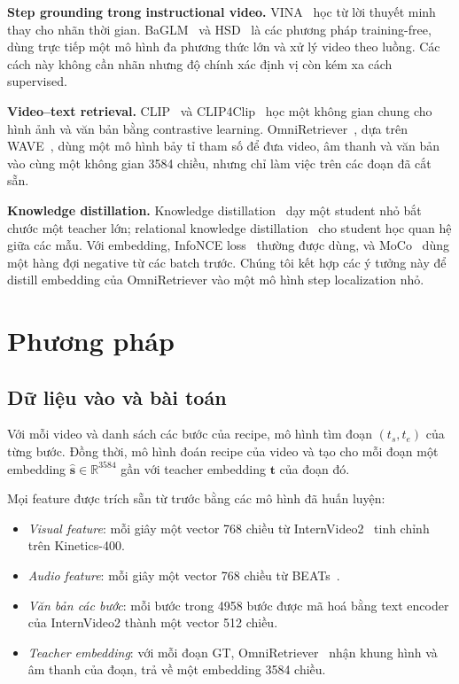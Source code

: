 \documentclass{IEEEtran}
\begin{document}
\textbf{Step grounding trong instructional video.} VINA~\cite{vina} học từ lời thuyết minh thay cho nhãn thời gian. BaGLM~\cite{baglm} và HSD~\cite{hsd} là các phương pháp training-free, dùng trực tiếp một mô hình đa phương thức lớn và xử lý video theo luồng. Các cách này không cần nhãn nhưng độ chính xác định vị còn kém xa cách supervised.

\textbf{Video--text retrieval.} CLIP~\cite{clip} và CLIP4Clip~\cite{clip4clip} học một không gian chung cho hình ảnh và văn bản bằng contrastive learning. OmniRetriever~\cite{omniretriever}, dựa trên WAVE~\cite{wave}, dùng một mô hình bảy tỉ tham số để đưa video, âm thanh và văn bản vào cùng một không gian 3584 chiều, nhưng chỉ làm việc trên các đoạn đã cắt sẵn.

\textbf{Knowledge distillation.} Knowledge distillation~\cite{kd} dạy một student nhỏ bắt chước một teacher lớn; relational knowledge distillation~\cite{rkd} cho student học quan hệ giữa các mẫu. Với embedding, InfoNCE loss~\cite{infonce} thường được dùng, và MoCo~\cite{moco} dùng một hàng đợi negative từ các batch trước. Chúng tôi kết hợp các ý tưởng này để distill embedding của OmniRetriever vào một mô hình step localization nhỏ.

\section{Phương pháp}

\subsection{Dữ liệu vào và bài toán}
Với mỗi video và danh sách các bước của recipe, mô hình tìm đoạn $(t_s, t_e)$ của từng bước. Đồng thời, mô hình đoán recipe của video và tạo cho mỗi đoạn một embedding $\hat{\mathbf{s}} \in \mathbb{R}^{3584}$ gần với teacher embedding $\mathbf{t}$ của đoạn đó.

Mọi feature được trích sẵn từ trước bằng các mô hình đã huấn luyện:
\begin{itemize}
\item \emph{Visual feature}: mỗi giây một vector 768 chiều từ InternVideo2~\cite{internvideo2} tinh chỉnh trên Kinetics-400.
\item \emph{Audio feature}: mỗi giây một vector 768 chiều từ BEATs~\cite{beats}.
\item \emph{Văn bản các bước}: mỗi bước trong 4958 bước được mã hoá bằng text encoder của InternVideo2 thành một vector 512 chiều.
\item \emph{Teacher embedding}: với mỗi đoạn GT, OmniRetriever~\cite{omniretriever} nhận khung hình và âm thanh của đoạn, trả về một embedding 3584 chiều.
\end{itemize}
\end{document}
